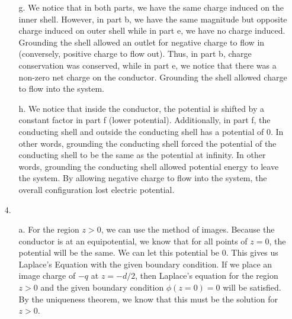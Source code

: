 \documentclass[12pt]{article}
\begin{document}
\begin{enumerate}
\begin{enumerate}
		\item [g.]
		We notice that in both parts, we have the same charge induced on the inner shell.
		However, in part b, we have the same magnitude but opposite charge induced on outer shell while in part e, we have no charge induced.
		Grounding the shell allowed an outlet for negative charge to flow in (conversely, positive charge to flow out).
		Thus, in part b, charge conservation was conserved, while in part e, we notice that there was a non-zero net charge on the conductor.
		Grounding the shell allowed charge to flow into the system.

		\item [h.]
		We notice that inside the conductor, the potential is shifted by a constant factor in part f (lower potential).
		Additionally, in part f, the conducting shell and outside the conducting shell has a potential of 0.
		In other words, grounding the conducting shell forced the potential of the conducting shell to be the same as the potential at infinity.
		In other words, grounding the conducting shell allowed potential energy to leave the system.
		By allowing negative charge to flow into the system, the overall configuration lost electric potential.
		
	\end{enumerate}

	\item [4.]
	\begin{enumerate}
		\item [a.]
		For the region $z>0$, we can use the method of images.
		Because the conductor is at an equipotential, we know that for all points of $z=0$, the potential will be the same.
		We can let this potential be $0$.
		This gives us Laplace's Equation with the given boundary condition.
		If we place an image charge of $-q$ at $z=-d/2$, then Laplace's equation for the region $z>0$ and the given boundary condition $\phi(z=0)=0$ will be satisfied.
		By the uniqueness theorem, we know that this must be the solution for $z>0$.


\end{enumerate}
\end{enumerate}
\end{document}
